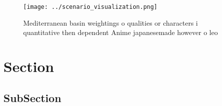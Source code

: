\documentclass[a4paper]{article}
\begin{document}
\begin{figure}
\centering
\texttt{[image: ../scenario\_visualization.png]}
\caption{Mediterranean basin weightings o qualities or characters i quantitative then dependent Anime japanesemade however o leo
}
\end{figure}
 
\section{Section}

\subsection{SubSection}
\end{document}
